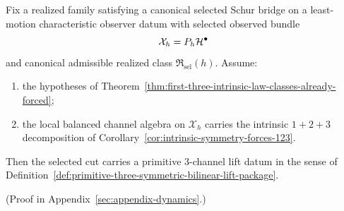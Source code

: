 \begin{theorem}
\label{thm:canonical-selected-schur-bridge-forces-primitive-three-bilinear-lift-package}
Fix a realized family satisfying a canonical selected Schur bridge on a
least-motion characteristic observer datum with selected observed bundle
\[
\mathcal X_h=P_h\mathcal{H}^\bullet
\]
and canonical admissible realized class \(\mathfrak R_{\mathrm{sel}}(h)\).
Assume:
\begin{enumerate}[label=(\roman*), leftmargin=2em, itemsep=0.2em]
\item the hypotheses of
      Theorem~\ref{thm:first-three-intrinsic-law-classes-already-forced};
\item the local balanced channel algebra on \(\mathcal X_h\) carries the
      intrinsic \(1+2+3\) decomposition of
      Corollary~\ref{cor:intrinsic-symmetry-forces-123}.
\end{enumerate}
Then the selected cut carries a primitive \(3\)-channel lift
datum in the sense of
Definition~\ref{def:primitive-three-symmetric-bilinear-lift-package}.
\end{theorem}

(Proof in Appendix~\ref{sec:appendix-dynamics}.)

